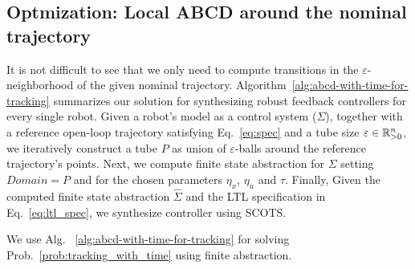 \subsection{Optmization: Local ABCD around the nominal trajectory}
It is not difficult to see that we only need to compute transitions in the $\varepsilon$-neighborhood of the given nominal trajectory.
Algorithm~\ref{alg:abcd-with-time-for-tracking} summarizes our solution for synthesizing robust feedback controllers for every single robot. 
Given a robot's model as a control system ($\Sigma$), together with a reference open-loop trajectory satisfying Eq.~\eqref{eq:spec} and a tube size $\varepsilon\in \mathbb{R}_{>0}^n$, we iteratively construct a tube $P$ as union of $\varepsilon$-balls around the reference trajectory's points. 
Next, we compute finite state abstraction for $\Sigma$ setting $Domain=P$ and for the chosen parameters $\eta_x$, $\eta_u$ and $\tau$. 
Finally, Given the computed finite state abstraction $\hat \Sigma$ and the LTL specification in Eq.~\eqref{eq:ltl_spec}, we synthesize controller using SCOTS. 

We use Alg.~ \ref{alg:abcd-with-time-for-tracking} for solving Prob.~\ref{prob:tracking_with_time} using finite abstraction.




